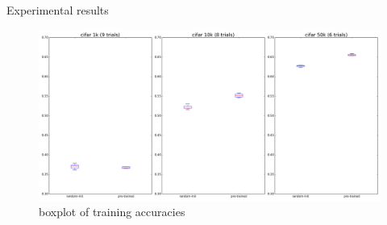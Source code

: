 \documentclass[final]{beamer}
\newlength{\onecolwid}
\begin{document}
\begin{frame}[t]
\begin{columns}[t]
\begin{column}{\onecolwid}
\begin{block}{Experimental results}
\begin{figure}
\includegraphics[width=\linewidth]{box_plots/boxplots_cifar.png}
\caption{boxplot of training accuracies}
\end{figure}

\begin{figure}
\centering


\end{figure}
\end{block}
\end{column}
\end{columns}
\end{frame}
\end{document}
